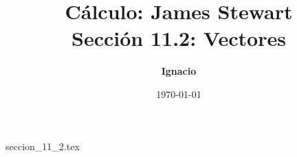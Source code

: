 \documentclass[11pt,spanish,oneside]{report}
\title{\textbf{Cálculo: James Stewart} \\ \Large Sección 11.2: Vectores}
\author{\textbf{Ignacio}}
\date{\today}
\begin{document}
\maketitle

{seccion_11_2.tex}
\end{document}
